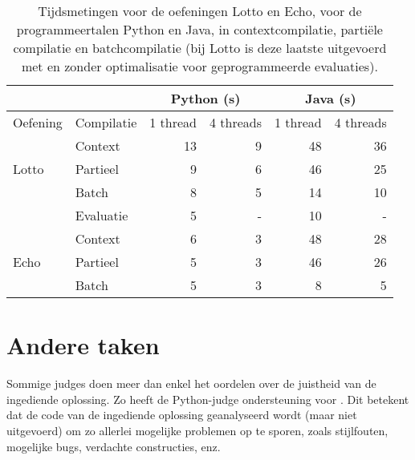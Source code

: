 \begin{table}
    \centering
    \begin{tabular}{ll|r|r|r|r|}
        \cline{3-6}
        & & \multicolumn{2}{c|}{Python (s)} & \multicolumn{2}{c|}{Java (s)}  \\
        \hline
        \multicolumn{1}{|l|}{Oefening}               & Compilatie & 1 thread & 4 threads & 1 thread & 4 threads \\
        \hline
        \multicolumn{1}{|l|}{\multirow{3}{*}{Lotto}} & Context    & 13       & 9         & 48       & 36        \\
        \multicolumn{1}{|l|}{}                       & Partieel   & 9        & 6         & 46       & 25        \\
        \multicolumn{1}{|l|}{}                       & Batch      & 8        & 5         & 14       & 10        \\
        \multicolumn{1}{|l|}{}                       & Evaluatie  & 5        & -         & 10       & -         \\
        \hline
        \multicolumn{1}{|l|}{\multirow{3}{*}{Echo}}  & Context    & 6        & 3         & 48       & 28        \\
        \multicolumn{1}{|l|}{}                       & Partieel   & 5        & 3         & 46       & 26        \\
        \multicolumn{1}{|l|}{}                       & Batch      & 5        & 3         & 8        & 5         \\
        \hline
    \end{tabular}
    \caption{Tijdsmetingen voor de oefeningen Lotto en Echo, voor de programmeertalen Python en Java, in contextcompilatie, partiële compilatie en batchcompilatie (bij Lotto is deze laatste uitgevoerd met en zonder optimalisatie voor geprogrammeerde evaluaties).}
    \label{tab:meting}
\end{table}

\section{Andere taken}\label{sec:andere-taken}

Sommige judges doen meer dan enkel het oordelen over de juistheid van de ingediende oplossing.
Zo heeft de Python-judge ondersteuning voor .
Dit betekent dat de code van de ingediende oplossing geanalyseerd wordt (maar niet uitgevoerd) om zo allerlei mogelijke problemen op te sporen, zoals stijlfouten, mogelijke bugs, verdachte constructies, enz.


